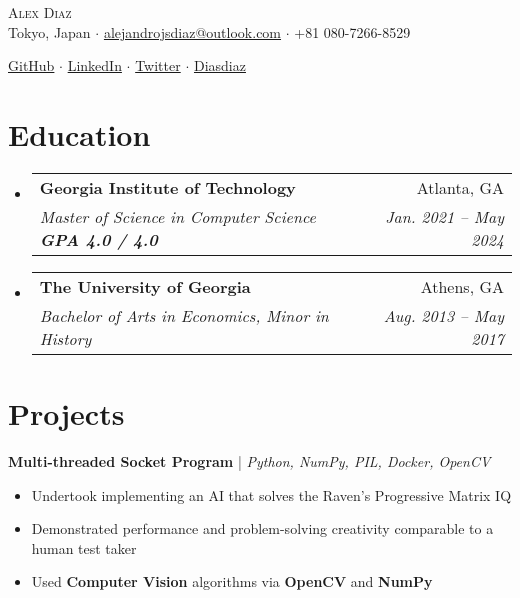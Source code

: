 \documentclass[12pt, a4paper]{article}
\makeatletter
\newcommand{\resumeSubheading}[4]{
  \vspace{-2pt}\item
    \begin{tabular*}{0.97\textwidth}[t]{l@{\extracolsep{\fill}}r}
      \textbf{#1} & #2 \\
      \textit{\small#3} & \textit{\small #4} \\
    \end{tabular*}\vspace{-7pt}
}
\newcommand{\resumeSubHeadingListStart}{\begin{itemize}[leftmargin=0.15in, label={}]}
\newcommand{\resumeSubHeadingListEnd}{\end{itemize}}
\makeatother
\begin{document}
    

\vspace*{-12pt}
\begin{center}
	{\Huge \scshape {Alex Diaz}}\\
	\vspace{1mm}
	\faMapMarker \hspace{.5mm} Tokyo, Japan $\cdot$ 
	\faEnvelope \hspace{.5mm} \href{mailto:alejandrojsdiaz@outlook.com}{alejandrojsdiaz@outlook.com} $\cdot$ \faMobile \hspace{.5mm} +81 080-7266-8529
		
	\faGithub \hspace{.5mm} \href{https://github.com/calmcoconut}{GitHub} $\cdot$
	\faLinkedin \hspace{.5mm} \href{https://www.linkedin.com/in/diazjalejandro/}{LinkedIn} $\cdot$
	\faTwitter \hspace{.5mm} \href{https://twitter.com/greetingsfriend}{Twitter} $\cdot$
    \faBriefcase \hspace{.5mm} \href{https://calmcoconut.github.io/diasDiaz/}{Diasdiaz}
    \\
\end{center}


\section{Education}
  \resumeSubHeadingListStart
    \resumeSubheading
      {Georgia Institute of Technology}{Atlanta, GA}
      {Master of Science in Computer Science \textbf{GPA 4.0 / 4.0}}{Jan. 2021 -- May 2024}
    \resumeSubheading
      {The University of Georgia}{Athens, GA}
      {Bachelor of Arts in Economics, Minor in History}{Aug. 2013 -- May 2017}
 \resumeSubHeadingListEnd

\section{Projects}
\textbf{Multi-threaded Socket Program} | \small\textit{Python, NumPy, PIL, Docker, OpenCV}
\begin{itemize}[noitemsep,topsep=0pt]
  \item Undertook implementing an AI that solves the Raven's Progressive Matrix IQ
  \item Demonstrated performance and problem-solving creativity comparable to a human test taker
  \item Used \textbf{Computer Vision} algorithms via \textbf{OpenCV} and \textbf{NumPy}
\end{itemize}
\end{document}
